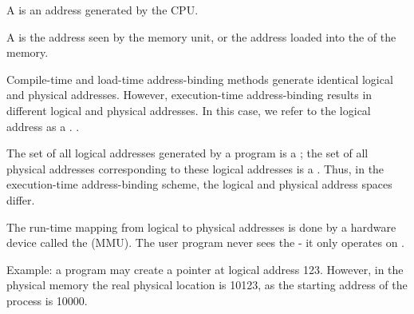    \par A  is an address generated by the CPU.
    \par A  is the address seen by the memory unit, or the address loaded into the  of the memory.
    \par Compile-time and load-time address-binding methods generate identical logical and physical addresses. However, execution-time address-binding results in different logical and physical addresses. In this case, we refer to the logical address as a . .
    \par The set of all logical addresses generated by a program is a ; the set of all physical addresses corresponding to these logical addresses is a . Thus, in the execution-time address-binding scheme, the logical and physical address spaces differ.
    \par The run-time mapping from logical to physical addresses is done by a hardware device called the  (MMU). The user program never sees the  - it only operates on .
    \par Example: a program may create a pointer at logical address 123. However, in the physical memory the real physical location is 10123, as the starting address of the process is 10000.